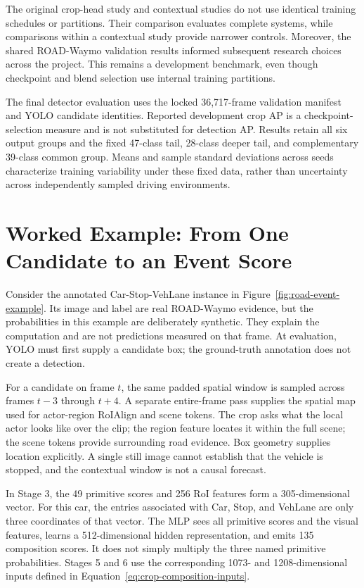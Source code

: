 The original crop-head study and contextual studies do not use identical training schedules or partitions. Their comparison evaluates complete systems, while comparisons within a contextual study provide narrower controls. Moreover, the shared ROAD-Waymo validation results informed subsequent research choices across the project. This remains a development benchmark, even though checkpoint and blend selection use internal training partitions.

The final detector evaluation uses the locked 36,717-frame validation manifest and YOLO candidate identities. Reported development crop AP is a checkpoint-selection measure and is not substituted for detection AP. Results retain all six output groups and the fixed 47-class tail, 28-class deeper tail, and complementary 39-class common group. Means and sample standard deviations across seeds characterize training variability under these fixed data, rather than uncertainty across independently sampled driving environments.

\section{Worked Example: From One Candidate to an Event Score}
\label{sec:worked-candidate}

Consider the annotated Car-Stop-VehLane instance in Figure~\ref{fig:road-event-example}. Its image and label are real ROAD-Waymo evidence, but the probabilities in this example are deliberately synthetic. They explain the computation and are not predictions measured on that frame. At evaluation, YOLO must first supply a candidate box; the ground-truth annotation does not create a detection.

For a candidate on frame \(t\), the same padded spatial window is sampled across frames \(t-3\) through \(t+4\). A separate entire-frame pass supplies the spatial map used for actor-region RoIAlign and scene tokens. The crop asks what the local actor looks like over the clip; the region feature locates it within the full scene; the scene tokens provide surrounding road evidence. Box geometry supplies location explicitly. A single still image cannot establish that the vehicle is stopped, and the contextual window is not a causal forecast.

In Stage 3, the 49 primitive scores and 256 RoI features form a 305-dimensional vector. For this car, the entries associated with Car, Stop, and VehLane are only three coordinates of that vector. The MLP sees all primitive scores and the visual features, learns a 512-dimensional hidden representation, and emits 135 composition scores. It does not simply multiply the three named primitive probabilities. Stages 5 and 6 use the corresponding 1073- and 1208-dimensional inputs defined in Equation~\ref{eq:crop-composition-inputs}.

